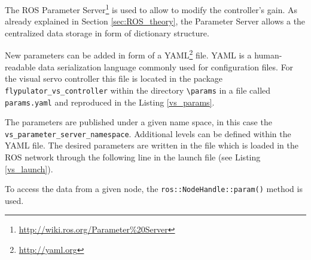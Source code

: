 The ROS Parameter Server\footnote{\url{http://wiki.ros.org/Parameter\%20Server}}  is used to allow to modify the controller's gain. As already explained in Section \ref{sec:ROS_theory}, the Parameter Server allows a the centralized data storage in form of dictionary structure. 

New parameters can be added in form of a YAML\footnote{\url{http://yaml.org}} file. YAML is a human-readable data serialization language commonly used for configuration files. For the visual servo controller this file is located in the package \texttt{flypulator\_vs\_controller} within the directory \texttt{\textbackslash params} in a file called \texttt{params.yaml} and reproduced in the Listing \ref{vs_params}.


The parameters are published under a given name space, in this case the \texttt{vs\_parameter\_server\_namespace}. Additional levels can be defined within the YAML file. The desired parameters are written in the file which is loaded in the ROS network through the following line in the launch file (see Listing \ref{vs_launch}).

 To access the data from a given node, the \texttt{ros::NodeHandle::param()} method is used. 

